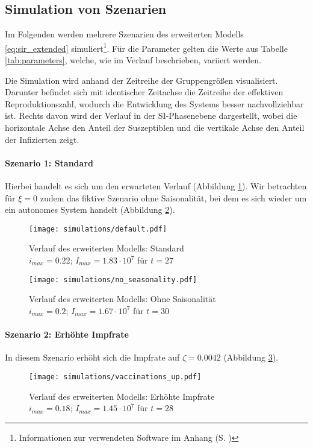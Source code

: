 \documentclass[../main.tex]{subfiles}
\begin{document}
    \subsection{Simulation von Szenarien}
    \label{ssec:simulation2}
    Im Folgenden werden mehrere Szenarien des erweiterten Modells \eqref{eq:sir_extended} simuliert\footnote{Informationen zur verwendeten Software im Anhang (S. \pageref{ap:simulation})}.
    Für die Parameter gelten die Werte aus Tabelle \ref{tab:parameters}, welche, wie im Verlauf beschrieben, variiert werden.

    Die Simulation wird anhand der Zeitreihe der Gruppengrößen visualisiert. Darunter befindet sich mit identischer Zeitachse die Zeitreihe der effektiven Reproduktionszahl, wodurch die Entwicklung des Systems besser nachvollziehbar ist. Rechts davon wird der Verlauf in der SI-Phasenebene dargestellt, wobei die horizontale Achse den Anteil der Suszeptiblen und die vertikale Achse den Anteil der Infizierten zeigt.

    \paragraph{Szenario 1: Standard}
    Hierbei handelt es sich um den erwarteten Verlauf (Abbildung \ref{fig:sim_default}). Wir betrachten für $\xi=0$ zudem das fiktive Szenario ohne Saisonalität, bei dem es sich wieder um ein autonomes System handelt (Abbildung \ref{fig:sim_no_seasonality}).
    \begin{figure}
        \centerline{\texttt{[image: simulations/default.pdf]}}
        \caption[Verlauf des erweiterten Modells: Standard]{Verlauf des erweiterten Modells: Standard \\ $i_{max}=0.22$; $I_{max}=1.83 \cdot 10^7$ für $t=27$}
        \label{fig:sim_default}
    \end{figure}
    \begin{figure}
        \centerline{\texttt{[image: simulations/no\_seasonality.pdf]}}
        \caption[Verlauf des erweiterten Modells: Ohne Saisonalität]{Verlauf des erweiterten Modells: Ohne Saisonalität \\ $i_{max}=0.2$; $I_{max}=1.67 \cdot 10^7$ für $t=30$}
        \label{fig:sim_no_seasonality}
    \end{figure}
     
    \paragraph{Szenario 2: Erhöhte Impfrate}
    In diesem Szenario erhöht sich die Impfrate auf $\zeta=0.0042$ (Abbildung \ref{fig:sim_vaccinations_up}).
    \begin{figure}
        \centerline{\texttt{[image: simulations/vaccinations\_up.pdf]}}
        \caption[Verlauf des erweiterten Modells: Erhöhte Impfrate]{Verlauf des erweiterten Modells: Erhöhte Impfrate \\ $i_{max}=0.18$; $I_{max}=1.45 \cdot 10^7$ für $t=28$}
        \label{fig:sim_vaccinations_up}
    \end{figure}
\end{document}
